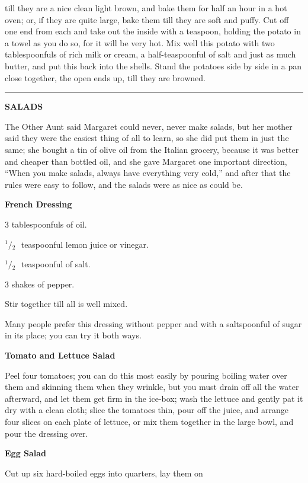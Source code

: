 \documentclass[11pt]{book}
\newcommand{\hstroke}{\rule[0.5ex]{5.0em}{0.2ex}}
\newcommand{\indpar}{\par\noindent\hspace*{\parindent}}
\newcommand{\ingredient}{\indpar}
\newcommand{\instruction}{\indpar}
\newcommand{\OneHalf}{\ensuremath{{}^1\!\!/\!{}_2\mbox{\ }}}
\newenvironment{RecipeTitle}{\medskip\begin{center}\large\bf }{\end{center}\smallskip}
\newenvironment{FoodTypeTitle}{\begin{center}\large\bf }{\end{center}}
\begin{document}
till they are a nice clean light brown, and bake them for
half an hour in a hot oven; or, if they are quite large,
bake them till they are soft and puffy.  Cut off one end
from each and take out the inside with a teaspoon, holding
the potato in a towel as you do so, for it will be very hot.
Mix well this potato with two tablespoonfuls of rich milk
or cream, a half-teaspoonful of salt and just as much
butter, and put this back into the shells.  Stand the
potatoes side by side in a pan close together, the open
ends up, till they are browned.
\bigskip
\begin{center}
\hstroke
\end{center}
\begin{FoodTypeTitle}
SALADS\label{SALADS}
\end{FoodTypeTitle}
\indpar
  The Other Aunt said Margaret could never, never make
salads, but her mother said they were the easiest thing
of all to learn, so she did put them in just the same;
she bought a tin of olive oil from the Italian grocery,
because it was better and cheaper than bottled oil, and
she gave Margaret one important direction, ``When you
make salads, always have everything very cold,'' and
after that the rules were easy to follow, and the salads
were as nice as could be.
\begin{RecipeTitle}
French Dressing\label{french_dressing}
\end{RecipeTitle}
\ingredient  3 tablespoonfuls of oil.
\ingredient  \OneHalf teaspoonful lemon juice or vinegar.
\ingredient  \OneHalf teaspoonful of salt.
\ingredient  3 shakes of pepper.
\instruction
  Stir together till all is well mixed.
\instruction
  Many people prefer this dressing without pepper and
with a saltspoonful of sugar in its place; you can
try it both ways.
\begin{RecipeTitle}
Tomato and Lettuce Salad\label{tomato_and_lettuce_salad}
\end{RecipeTitle}
\instruction
  Peel four tomatoes; you can do this most easily by
pouring boiling water over them and skinning them when
they wrinkle, but you must drain off all the water
afterward, and let them get firm in the ice-box; wash
the lettuce and gently pat it dry with a clean cloth;
slice the tomatoes thin, pour off the juice, and arrange
four slices on each plate of lettuce, or mix them
together in the large bowl, and pour the dressing over.
\begin{RecipeTitle}
Egg Salad\label{egg_salad}
\end{RecipeTitle}
\instruction
  Cut up six hard-boiled eggs into quarters, lay them on
\end{document}
